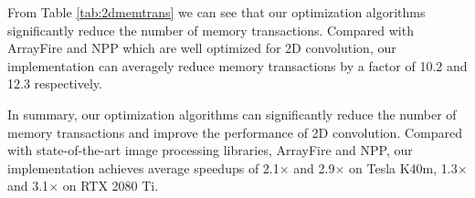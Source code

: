 From Table \ref{tab:2dmemtrans} we can see that our optimization algorithms significantly reduce the number of memory transactions.
Compared with ArrayFire and NPP which are well optimized for 2D convolution, our implementation can averagely reduce memory transactions by
a factor of 10.2 and 12.3 respectively.




In summary, our optimization algorithms can significantly reduce the number of memory transactions and improve the performance of 2D
convolution. Compared with state-of-the-art image processing libraries, ArrayFire and NPP, our implementation achieves average speedups of
2.1$\times$ and 2.9$\times$ on Tesla K40m, 1.3$\times$ and 3.1$\times$ on RTX 2080 Ti.

